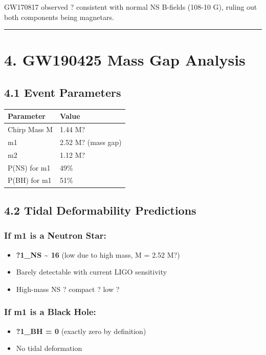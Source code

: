 \documentclass[11pt]{article}
\begin{document}
GW170817 observed ? consistent with normal NS B-fields (108-10 G), ruling out both components being magnetars.

\noindent\rule{\textwidth}{0.4pt}

\section*{4. GW190425 Mass Gap Analysis}

\subsection*{4.1 Event Parameters}

\begin{center}
\begin{longtable}{ll}
\toprule
Parameter & Value \tabularnewline
\midrule
\endhead
Chirp Mass M & 1.44 M? \tabularnewline
m1 & 2.52 M? (mass gap) \tabularnewline
m2 & 1.12 M? \tabularnewline
P(NS) for m1 & 49\% \tabularnewline
P(BH) for m1 & 51\% \tabularnewline
\bottomrule
\end{longtable}
\end{center}

\subsection*{4.2 Tidal Deformability Predictions}

\subsubsection*{If m1 is a Neutron Star:}

\begin{itemize}
  \item \textbf{?1\_NS \textasciitilde{} 16} (low due to high mass, M = 2.52 M?)
  \item Barely detectable with current LIGO sensitivity
  \item High-mass NS ? compact ? low ?
\end{itemize}

\subsubsection*{If m1 is a Black Hole:}

\begin{itemize}
  \item \textbf{?1\_BH = 0} (exactly zero by definition)
  \item No tidal deformation
\end{itemize}
\end{document}
